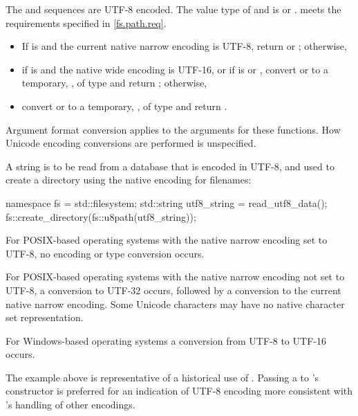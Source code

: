 \begin{itemdescr}
\pnum
\requires The  and 
  sequences are UTF-8 encoded. The value type of 
  and  is  or .
   meets the requirements specified in \ref{fs.path.req}.

\pnum
\returns
\begin{itemize}
\item If  is  and the current native
      narrow encoding is UTF-8,
      return  or ;
      otherwise,
\item if  is  and the
      native wide encoding is UTF-16, or
      if  is  or ,
      convert  or 
      to a temporary, , of type  and
      return ;
      otherwise,
\item convert  or 
      to a temporary, , of type  and
      return .
\end{itemize}

\pnum
\remarks
Argument format conversion applies to the
  arguments for these functions. How Unicode encoding conversions are performed is
  unspecified.

\pnum
\begin{example}
A string is to be read from a database that is encoded in UTF-8, and used
    to create a directory using the native encoding for filenames:
\begin{codeblock}
namespace fs = std::filesystem;
std::string utf8_string = read_utf8_data();
fs::create_directory(fs::u8path(utf8_string));
\end{codeblock}

For POSIX-based operating systems with the native narrow encoding set
    to UTF-8, no encoding or type conversion occurs.

For POSIX-based operating systems with the native narrow encoding not
    set to UTF-8, a conversion to UTF-32 occurs, followed by a conversion to the
    current native narrow encoding. Some Unicode characters may have no native character
    set representation.

For Windows-based operating systems a conversion from UTF-8 to
    UTF-16 occurs.
\end{example}
\begin{note}
The example above is representative of
a historical use of .
Passing a  to 's constructor is preferred
for an indication of UTF-8 encoding more consistent with
's handling of other encodings.
\end{note}
\end{itemdescr}

